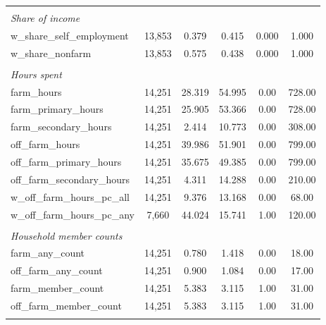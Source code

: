 \documentclass[a4paper,11pt]{article}
\begin{document}
\begin{table}[H]
{\begin{tabular}{@{\extracolsep{5pt}}lccccc}
  & & &  &  &  \\ 

 \textit{Share of income} & & &  &  &  \\ 
w\_share\_self\_employment & 13,853 & 0.379 & 0.415 & 0.000 & 1.000 \\ 
w\_share\_nonfarm & 13,853 & 0.575 & 0.438 & 0.000 & 1.000 \\ 

  & & &  &  &  \\ 

 \textit{Hours spent} & & &  &  &  \\ 

farm\_hours & 14,251 & 28.319 & 54.995 & 0.00 & 728.00 \\
farm\_primary\_hours & 14,251 & 25.905 & 53.366 & 0.00 & 728.00 \\ 
farm\_secondary\_hours & 14,251 & 2.414 & 10.773 & 0.00 & 308.00 \\ 

off\_farm\_hours & 14,251 & 39.986 & 51.901 & 0.00 & 799.00 \\ 
off\_farm\_primary\_hours & 14,251 & 35.675 & 49.385 & 0.00 & 799.00 \\ 
off\_farm\_secondary\_hours & 14,251 & 4.311 & 14.288 & 0.00 & 210.00 \\ 

w\_off\_farm\_hours\_pc\_all & 14,251 & 9.376 & 13.168 & 0.00 & 68.00 \\ 
w\_off\_farm\_hours\_pc\_any & 7,660 & 44.024 & 15.741 & 1.00 & 120.00 \\ 


  & & &  &  &  \\ 

 \textit{Household member counts} & & &  &  &  \\ 
farm\_any\_count & 14,251 & 0.780 & 1.418 & 0.00 & 18.00 \\ 
off\_farm\_any\_count & 14,251 & 0.900 & 1.084 & 0.00 & 17.00 \\ 
farm\_member\_count & 14,251 & 5.383 & 3.115 & 1.00 & 31.00 \\ 
off\_farm\_member\_count & 14,251 & 5.383 & 3.115 & 1.00 & 31.00 \\ 

\hline \\[-1.8ex] 
\end{tabular} }
\end{table} 
\end{document}
